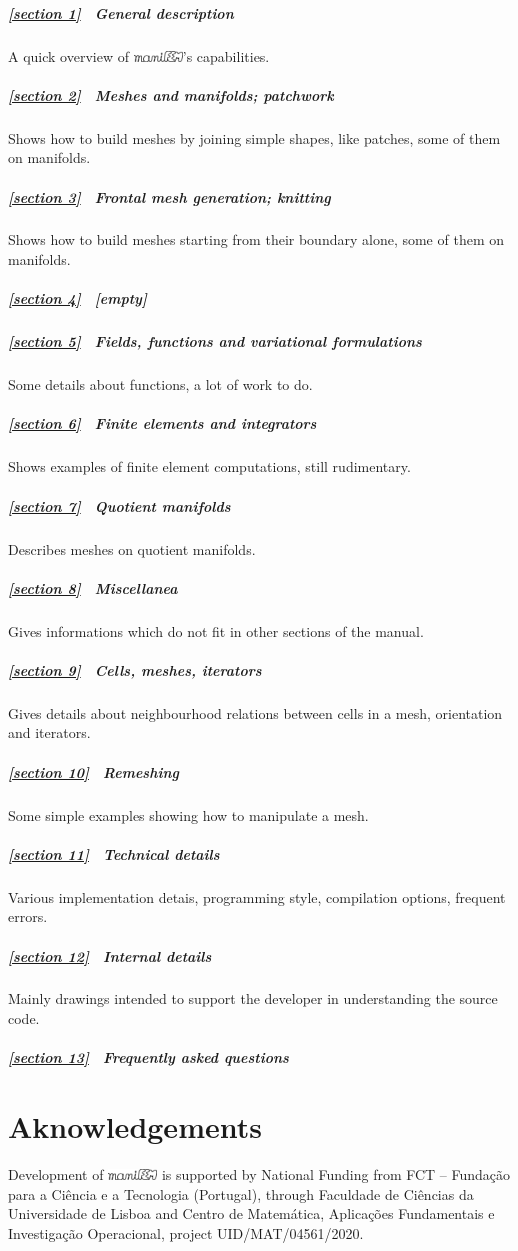 \documentclass[a4paper,oneside]{scrbook}
\def\numb{}
\newcommand\maniFEM{\leavevmode\hbox{\includegraphics[width=13mm]{manifem-small}}}
\newcommand\cinzasec[1]{\textcolor{comentsec}{#1}}
\begin{document}
\subparagraph*{\ref{\numb section 1} \ General description}
A quick overview of \maniFEM's capabilities.

\subparagraph*{\ref{\numb section 2} \ Meshes and manifolds; patchwork}
Shows how to build meshes by joining simple shapes, like patches, some of them on manifolds.

\subparagraph*{\ref{\numb section 3} \ Frontal mesh generation; knitting}
Shows how to build meshes starting from their boundary alone, some of them on manifolds.

\subparagraph*{\ref{\numb section 4} \ \cinzasec{[empty]}}

\subparagraph*{\ref{\numb section 5} \ Fields, functions and variational formulations}
Some details about functions, a lot of work to do.

\subparagraph*{\ref{\numb section 6} \ Finite elements and integrators}
Shows examples of finite element computations, still rudimentary.

\subparagraph*{\ref{\numb section 7} \ Quotient manifolds}
Describes meshes on quotient manifolds.

\subparagraph*{\ref{\numb section 8} \ Miscellanea}
Gives informations which do not fit in other sections of the manual.

\subparagraph*{\ref{\numb section 9} \ Cells, meshes, iterators}
Gives details about neighbourhood relations between cells in a mesh, orientation and iterators.

\subparagraph*{\ref{\numb section 10} \ Remeshing}
Some simple examples showing how to manipulate a mesh.

\subparagraph*{\ref{\numb section 11} \ Technical details}
Various implementation detais, programming style, compilation options, frequent errors.

\subparagraph*{\ref{\numb section 12} \ Internal details}
Mainly drawings intended to support the developer in understanding the source code.

\subparagraph*{\ref{\numb section 13} \ Frequently asked questions} \hglue 2cm
\vfil\eject


\section*{Aknowledgements}

Development of {\maniFEM} is supported by National Funding from FCT -- Funda\c c\~ao
para a Ci\^encia e a Tecnologia (Portugal), through Faculdade de Ci\^encias da Universidade
de Lisboa and Centro de Matem\'atica, Aplica\c c\~oes Fundamentais e Investiga\c c\~ao
Operacional, project UID/MAT/04561/2020.
\end{document}
